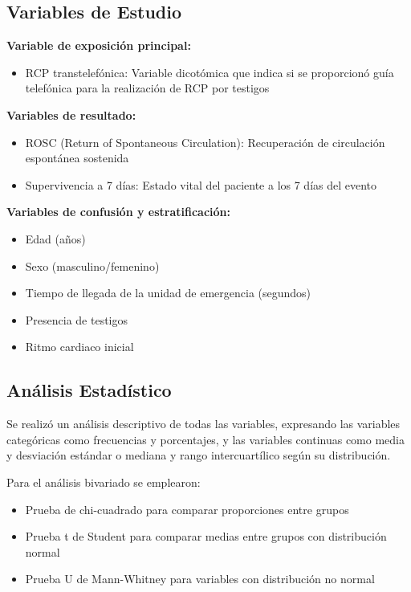 \documentclass[10pt,a4paper]{article}
\begin{document}
\begin{multicols}{2}
\subsection{Variables de Estudio}

\textbf{Variable de exposición principal:}
\begin{itemize}
\item RCP transtelefónica: Variable dicotómica que indica si se proporcionó guía telefónica para la realización de RCP por testigos
\end{itemize}

\textbf{Variables de resultado:}
\begin{itemize}
\item ROSC (Return of Spontaneous Circulation): Recuperación de circulación espontánea sostenida
\item Supervivencia a 7 días: Estado vital del paciente a los 7 días del evento
\end{itemize}

\textbf{Variables de confusión y estratificación:}
\begin{itemize}
\item Edad (años)
\item Sexo (masculino/femenino)
\item Tiempo de llegada de la unidad de emergencia (segundos)
\item Presencia de testigos
\item Ritmo cardiaco inicial
\end{itemize}

\subsection{Análisis Estadístico}

Se realizó un análisis descriptivo de todas las variables, expresando las variables categóricas como frecuencias y porcentajes, y las variables continuas como media y desviación estándar o mediana y rango intercuartílico según su distribución.

Para el análisis bivariado se emplearon:
\begin{itemize}
\item Prueba de chi-cuadrado para comparar proporciones entre grupos
\item Prueba t de Student para comparar medias entre grupos con distribución normal
\item Prueba U de Mann-Whitney para variables con distribución no normal
\end{itemize}


\end{multicols}
\end{document}
